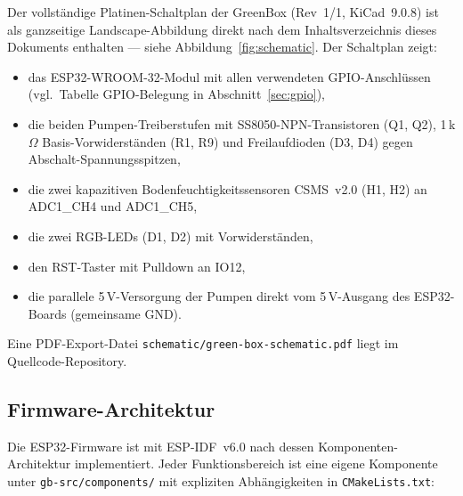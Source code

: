 \documentclass[a4paper,12pt]{article}
\begin{document}
Der vollständige Platinen-Schaltplan der GreenBox (Rev~1/1, KiCad~9.0.8)
ist als ganzseitige Landscape-Abbildung direkt nach dem
Inhaltsverzeichnis dieses Dokuments enthalten ---
siehe Abbildung~\ref{fig:schematic}. Der Schaltplan zeigt:

\begin{itemize}
  \item das ESP32-WROOM-32-Modul mit allen verwendeten GPIO-Anschlüssen
        (vgl.\ Tabelle GPIO-Belegung in Abschnitt~\ref{sec:gpio}),
  \item die beiden Pumpen-Treiberstufen mit
        SS8050-NPN-Transistoren (Q1, Q2), 1\,k$\Omega$
        Basis-Vorwiderständen (R1, R9) und Freilaufdioden (D3, D4)
        gegen Abschalt-Spannungsspitzen,
  \item die zwei kapazitiven Bodenfeuchtigkeitssensoren CSMS~v2.0 (H1, H2)
        an ADC1\_CH4 und ADC1\_CH5,
  \item die zwei RGB-LEDs (D1, D2) mit Vorwiderständen,
  \item den RST-Taster mit Pulldown an IO12,
  \item die parallele 5\,V-Versorgung der Pumpen direkt vom
        5\,V-Ausgang des ESP32-Boards (gemeinsame GND).
\end{itemize}

Eine PDF-Export-Datei \texttt{schematic/green-box-schematic.pdf}
liegt im Quellcode-Repository.

\subsection{Firmware-Architektur}

Die ESP32-Firmware ist mit ESP-IDF~v6.0 nach dessen
Komponenten-Architektur implementiert. Jeder Funktionsbereich ist
eine eigene Komponente unter \texttt{gb-src/components/} mit
expliziten Abhängigkeiten in \texttt{CMakeLists.txt}:
\end{document}
